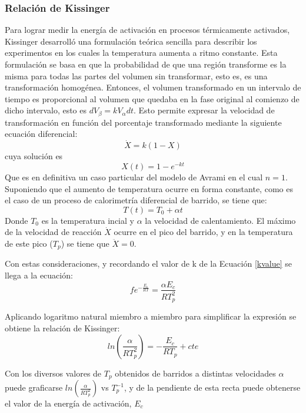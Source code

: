 \documentclass[12pt]{article}
\theoremstyle{definition}
\theoremstyle{remark}
\begin{document}
\subsubsection{Relación de Kissinger}
Para lograr medir la energía de activación en procesos térmicamente activados, Kissinger desarrolló una formulación teórica sencilla para describir los experimentos en los cuales la temperatura aumenta a ritmo constante. Esta formulación se basa en que la probabilidad de que una región transforme es la misma para todas las partes del volumen sin transformar, esto es, es una transformación homogénea. Entonces, el volumen transformado en un intervalo de tiempo es proporcional al volumen que quedaba en la fase original al comienzo de dicho intervalo, esto es $dV_\beta = k V_\alpha dt$. Esto permite expresar la velocidad de transformación en función del porcentaje transformado mediante la siguiente ecuación diferencial:
\begin{equation}
	\dot{X} = k(1-X)
\end{equation}
cuya solución es
\begin{equation}
	X(t) = 1 - e^{-kt}
\end{equation}
Que es en definitiva un caso particular del modelo de Avrami en el cual $n=1$.
Suponiendo que el aumento de temperatura ocurre en forma constante, como es el caso de un proceso de calorimetría diferencial de barrido, se tiene que:
\begin{equation}
	T(t) = T_0+\alpha t
\end{equation}
Donde $T_0$ es la temperatura incial y $\alpha$ la velocidad de calentamiento. El máximo de la velocidad de reacción $\dot{X}$ ocurre en el pico del barrido, y en la temperatura de este pico ($T_p$) se tiene que $\ddot{X} = 0$.

Con estas consideraciones, y recordando el valor de k de la Ecuación \ref{kvalue} se llega a la ecuación:
\begin{equation}
	fe^{-\frac{E_c}{RT}} = \frac{\alpha E_c}{R T_p^2}
\end{equation}

Aplicando logaritmo natural miembro a miembro para simplificar la expresión se obtiene la relación de Kissinger:
\begin{equation}
	ln(\frac{\alpha}{R T_p^2}) = -\frac{E_c}{RT_p} + cte
\end{equation}

Con los diversos valores de $T_p$ obtenidos de barridos a distintas velocidades $\alpha$ puede graficarse $ln(\frac{\alpha}{R T_p^2})$ vs $T_p^{-1}$, y de la pendiente de esta recta puede obtenerse el valor de la energía de activación, $E_c$
\end{document}
